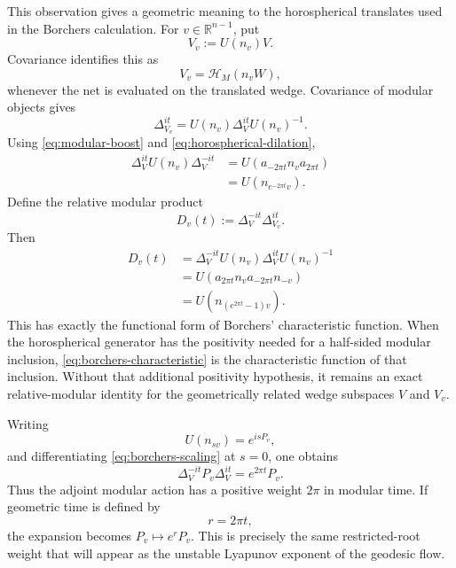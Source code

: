 \documentclass[11pt]{article}
\theoremstyle{definition}
\newcommand{\cH}{\mathcal{H}}
\newcommand{\nn}{\nonumber}
\begin{document}
This observation gives a geometric meaning to the horospherical translates used in the
Borchers calculation.  For \(v\in\mathbb R^{n-1}\), put
\[
V_v:=U(n_v)V.
\]
Covariance identifies this as
\[
V_v=\cH_M(n_vW),
\]
whenever the net is evaluated on the translated wedge.  Covariance of modular objects
gives
\[
\Delta_{V_v}^{it}
=
U(n_v)\Delta_V^{it}U(n_v)^{-1}.
\]
Using \eqref{eq:modular-boost} and \eqref{eq:horospherical-dilation},
\begin{align}
\Delta_V^{it}U(n_v)\Delta_V^{-it}
&=
U(a_{-2\pi t}n_va_{2\pi t})
\nn\\
&=
U(n_{e^{-2\pi t}v}).
\label{eq:borchers-scaling}
\end{align}
Define the relative modular product
\begin{equation}
D_v(t):=\Delta_V^{-it}\Delta_{V_v}^{it}.
\label{eq:relative-modular}
\end{equation}
Then
\begin{align}
D_v(t)
&=
\Delta_V^{-it}U(n_v)\Delta_V^{it}U(n_v)^{-1}
\nn\\
&=
U(a_{2\pi t}n_va_{-2\pi t}n_{-v})
\nn\\
&=
U(n_{(e^{2\pi t}-1)v}).
\label{eq:borchers-characteristic}
\end{align}
This has exactly the functional form of Borchers' characteristic function.  When the
horospherical generator has the positivity needed for a half-sided modular inclusion,
\eqref{eq:borchers-characteristic} is the characteristic function of that inclusion.
Without that additional positivity hypothesis, it remains an exact relative-modular
identity for the geometrically related wedge subspaces \(V\) and \(V_v\).

Writing
\[
U(n_{sv})=e^{isP_v},
\]
and differentiating \eqref{eq:borchers-scaling} at \(s=0\), one obtains
\begin{equation}
\Delta_V^{-it}P_v\Delta_V^{it}
=
e^{2\pi t}P_v.
\label{eq:modular-generator-scaling}
\end{equation}
Thus the adjoint modular action has a positive weight \(2\pi\) in modular time.  If
geometric time is defined by
\[
r=2\pi t,
\]
the expansion becomes \(P_v\mapsto e^rP_v\).  This is precisely the same restricted-root
weight that will appear as the unstable Lyapunov exponent of the geodesic flow.
\end{document}
